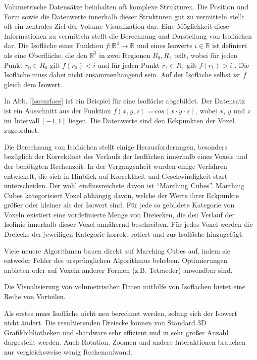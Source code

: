 \documentclass[a4paper,fontsize=12pt,toc=bib,halfparskip]{scrartcl}
\begin{document}
Volumetrische Datens\"atze beinhalten oft komplexe Strukturen. Die Position und Form sowie die Datenwerte innerhalb dieser Strukturen gut zu vermitteln stellt oft ein zentrales Ziel der Volume Visualization dar. Eine M\"oglichkeit diese Informationen zu vermitteln stellt die Berechnung und Darstellung von Isofl\"achen dar. Die Isofl\"ache einer Funktion $f: \mathbb{R}^3\rightarrow\mathbb{R}$ und eines Isowerts $i \in \mathbb{R}$ ist definiert als eine Oberfl\"ache, die den $\mathbb{R}^3$ in zwei Regionen $R_0, R_1$ teilt, wobei f\"ur jeden Punkt $r_0 \in R_0$ gilt $f(r_0) < i$ und f\"ur jeden Punkt $r_1 \in R_1$ gilt $f(r_1) > i$ \cite[S.~7]{hansen2005visualization}. Die Isofl\"ache muss dabei nicht zusammenh\"angend sein. Auf der Isofl\"ache selbst ist $f$ gleich dem Isowert. 

In Abb. \ref{Isosurface} ist ein Beispiel f\"ur eine Isofl\"ache abgebildet. Der Datensatz ist ein Ausschnitt aus der Funktion $f(x,y,z) = cos(x \cdot y \cdot z)$, wobei $x$, $y$ und $z$ im Intervall $[-1,1]$ liegen. Die Datenwerte sind den Eckpunkten der Voxel zugeordnet. 

Die Berechnung von Isofl\"achen stellt einige Herausforderungen, besonders bez\"uglich der Korrektheit des Verlaufs der Isofl\"achen innerhalb eines Voxels und der ben\"otigten Rechenzeit. In der Vergangenheit wurden einige Verfahren entwickelt, die sich in Hinblick auf Korrektheit und Geschwindigkeit start unterscheiden. Der wohl einflussreichste davon ist ``Marching Cubes''. Marching Cubes kategorisiert Voxel abh\"angig davon, welche der Werte ihrer Eckpunkte gr\"o{\ss}er oder kleiner als der Isowert sind. F\"ur jede so gebildete Kategorie von Voxeln existiert eine vordefinierte Menge von Dreiecken, die den Verlauf der Isolinie innerhalb dieser Voxel ann\"ahernd beschreiben. F\"ur jedes Voxel werden die Dreiecke der jeweiligen Kategorie korrekt rotiert und zur Isofl\"ache hinzugef\"ugt.

Viele neuere Algorithmen bauen direkt auf Marching Cubes auf, indem sie entweder Fehler des urspr\"unglichen Algorithmus beheben, Optimierungen anbieten oder auf Voxeln anderer Formen (z.B. Tetraeder) anwendbar sind.

Die Visualisierung von volumetrischen Daten mithilfe von Isofl\"achen bietet eine Reihe von Vorteilen. 

Als erstes muss Isofl\"ache nicht neu berechnet werden, solang sich der Isowert nicht \"andert. Die resultierenden Dreiecke k\"onnen von Standard 3D Grafikbibliotheken und -hardware sehr effizient und in sehr gro{\ss}er Anzahl dargestellt werden. Auch Rotation, Zoomen und andere Interaktionen brauchen nur vergleichsweise wenig Rechenaufwand.
\end{document}
